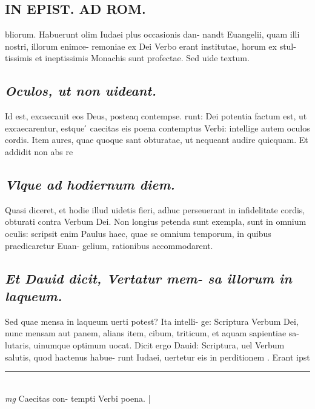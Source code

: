 \documentclass{article}
\begin{document}
\begin{pages}
\section*{IN EPIST. AD ROM.  }
\marginpar{[ p.117 ]}\pstart bliorum. Habuerunt olim Iudaei plus occasionis dan- nandt Euangelii, quam illi nostri, illorum enimce- remoniae ex Dei Verbo erant institutae, horum ex stul- tissimis et ineptissimis Monachis sunt profectae. Sed uide textum.   \pend
{}
{}
\subsection*{\textit{Oculos, ut non uideant. }}\pstart Id est, excaecauit eos Deus, posteaq contempse. runt: Dei potentia factum est, ut excaecarentur, estque ́ caecitas eis poena contemptus Verbi: intellige autem oculos cordis. Item aures, quae quoque sant obturatae, ut nequeant audire quicquam. Et addidit non abs re  \pend
{}
{}
\subsection*{\textit{Vlque ad hodiernum diem. }}\pstart Quasi diceret, et hodie illud uidetis fieri, adhuc perseuerant in infidelitate cordis, obturati contra Verbum Dei. Non longius petenda sunt exempla, sunt in omnium oculis: scripsit enim Paulus haec, quae se omnium temporum, in quibus praedicaretur Euan- gelium, rationibus accommodarent.  \pend
{}
{}
\subsection*{\textit{Et Dauid dicit, Vertatur mem- sa illorum in laqueum. }}\pstart Sed quae mensa in laqueum uerti potest? Ita intelli- ge: Scriptura Verbum Dei, nunc mensam aut panem, alians item, cibum, triticum, et aquam sapientiae sa- lutaris, uinumque optimum uocat. Dicit ergo Dauid: Scriptura, uel Verbum salutis, quod hactenus habue- runt Iudaei, uertetur eis in perditionem . Erant ipst  \pend
\vspace{0.5cm}\noindent
\vspace{0.2cm}\rule{1cm}{0.2pt}\\ 
\hspace{0.2cm}\textit{mg}
\footnotesize Caecitas con- tempti Verbi poena.  
\normalsize| 

\end{pages}
\end{document}
